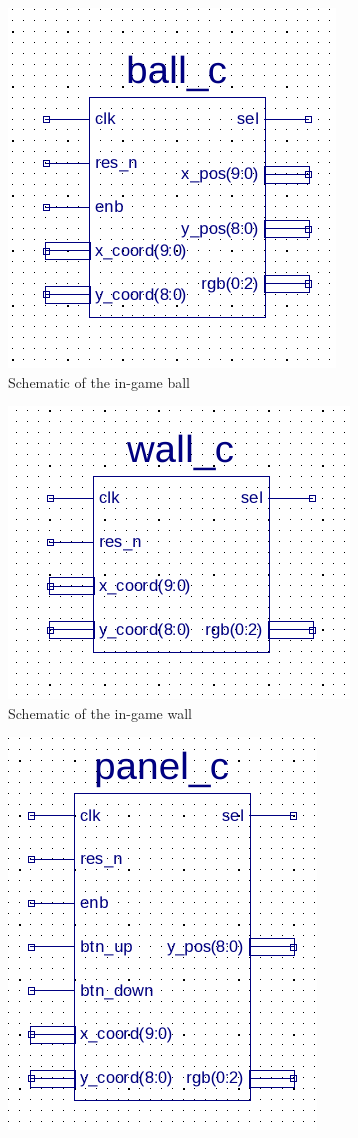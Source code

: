 \documentclass[12pt]{article}
\begin{document}
	\begin{figure}[h]
		\centering
		\begin{subfigure}[b]{.4\textwidth}
			\centering
			\includegraphics[scale=0.4]{images/ball_c.png}
			\caption{Schematic of the in-game ball}
		\end{subfigure}
		\hfill
		\begin{subfigure}[b]{.4\textwidth}
			\centering
			\includegraphics[scale=0.4]{images/wall_c.png}		
			\caption{Schematic of the in-game wall}
		\end{subfigure}
		\hfill
		\begin{subfigure}[b]{.4\textwidth}
			\centering
			\includegraphics[scale=0.4]{images/panel_c.png}		

\end{subfigure}
\end{figure}
\end{document}
